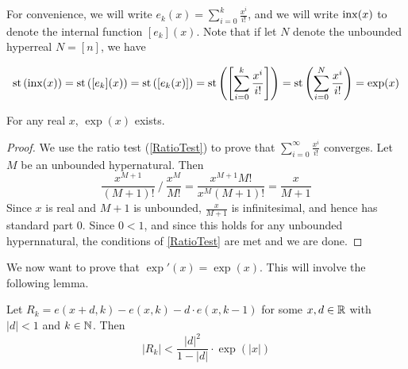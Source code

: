 For convenience, we will write $e_k(x) = \sum_{i=0}^k \frac{x^i}{i!}$, and we will write $\operatorname{inx}(x)$ to denote the internal function $[e_k](x)$. Note that if let $N$ denote the unbounded hyperreal $N = [n]$, we have

\[\operatorname{st}\left(\operatorname{inx}(x)\right) = \operatorname{st}\left([e_k](x)\right) = \operatorname{st}\left([e_k(x)]\right) = \operatorname{st}\left(\left[\sum_{i=0}^k\frac{x^i}{i!}\right]\right) = \operatorname{st}\left(\sum_{i=0}^N \frac{x^i}{i!}\right) = \exp(x) \]

\begin{thm}\label{expExists}
    For any real $x$, $\exp(x)$ exists.
\end{thm}

\begin{proof}
    We use the ratio test (\ref{RatioTest}) to prove that $\sum_{i=0}^\infty \frac{x^i}{i!}$ converges. Let $M$ be an unbounded hypernatural. Then 
    \[
        \frac{x^{M+1}}{(M+1)!} \  / \  \frac{x^M}{M!} = \frac{x^{M+1}M!}{x^M (M+1)!} 
        = \frac{x}{M+1}
    \]
    Since $x$ is real and $M+1$ is unbounded, $\frac{x}{M+1}$ is infinitesimal, and hence has standard part $0$. Since $0 < 1$, and since this holds for any unbounded hypernnatural, the conditions of \ref{RatioTest} are met and we are done.
\end{proof}

We now want to prove that $\exp'(x) = \exp(x)$. This will involve the following lemma.

\begin{lemma}\label{expRemainderLemma}
    Let $R_k = e(x+d, k) - e(x, k) - d \cdot e(x, k-1)$ for some $x, d \in \mathbb{R}$ with $|d| < 1$ and $k \in \mathbb{N}$. Then
    \[ |R_k| < \frac{|d|^2}{1-|d|} \cdot \exp(|x|) \]
\end{lemma}

